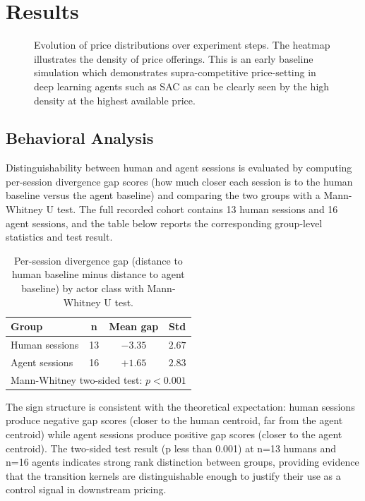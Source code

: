 \section{Results}
\begin{figure}[ht]
    \centering
    
    \caption{Evolution of price distributions over experiment steps. The heatmap illustrates the density of price offerings. This is an early baseline simulation which demonstrates supra-competitive price-setting in deep learning agents such as SAC as can be clearly seen by the high density at the highest available price.}
    \label{fig:supra_heatmap}
\end{figure}

\subsection{Behavioral Analysis}

Distinguishability between human and agent sessions is evaluated by computing per-session divergence gap scores (how much closer each session is to the human baseline versus the agent baseline) and comparing the two groups with a Mann-Whitney U test. The full recorded cohort contains 13 human sessions and 16 agent sessions, and the table below reports the corresponding group-level statistics and test result.

\begin{table}[ht]
\centering
\caption{Per-session divergence gap (distance to human baseline minus distance to agent baseline) by actor class with Mann-Whitney U test.}
\label{tab:divergence_significance}
\begin{tabular}{lccc}
\toprule
Group & n & Mean gap & Std \\
\midrule
Human sessions & 13 & $-3.35$ & $2.67$ \\
Agent sessions & 16 & $+1.65$ & $2.83$ \\
\midrule
\multicolumn{4}{l}{Mann-Whitney two-sided test: $p<0.001$} \\
\bottomrule
\end{tabular}
\end{table}

The sign structure is consistent with the theoretical expectation: human sessions produce negative gap scores (closer to the human centroid, far from the agent centroid) while agent sessions produce positive gap scores (closer to the agent centroid). The two-sided test result (p less than 0.001) at n=13 humans and n=16 agents indicates strong rank distinction between groups, providing evidence that the transition kernels are distinguishable enough to justify their use as a control signal in downstream pricing.

